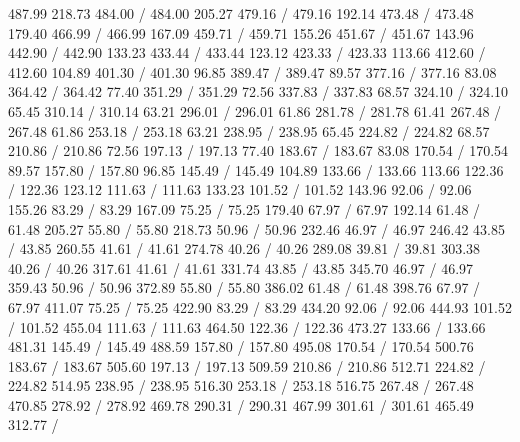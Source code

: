 { 487.99 218.73 484.00 /
 484.00 205.27 479.16 /
 479.16 192.14 473.48 /
 473.48 179.40 466.99 /
 466.99 167.09 459.71 /
 459.71 155.26 451.67 /
 451.67 143.96 442.90 /
 442.90 133.23 433.44 /
 433.44 123.12 423.33 /
 423.33 113.66 412.60 /
 412.60 104.89 401.30 /
 401.30 96.85 389.47 /
 389.47 89.57 377.16 /
 377.16 83.08 364.42 /
 364.42 77.40 351.29 /
 351.29 72.56 337.83 /
 337.83 68.57 324.10 /
 324.10 65.45 310.14 /
 310.14 63.21 296.01 /
 296.01 61.86 281.78 /
 281.78 61.41 267.48 /
 267.48 61.86 253.18 /
 253.18 63.21 238.95 /
 238.95 65.45 224.82 /
 224.82 68.57 210.86 /
 210.86 72.56 197.13 /
 197.13 77.40 183.67 /
 183.67 83.08 170.54 /
 170.54 89.57 157.80 /
 157.80 96.85 145.49 /
 145.49 104.89 133.66 /
 133.66 113.66 122.36 /
 122.36 123.12 111.63 /
 111.63 133.23 101.52 /
 101.52 143.96 92.06 /
 92.06 155.26 83.29 /
 83.29 167.09 75.25 /
 75.25 179.40 67.97 /
 67.97 192.14 61.48 /
 61.48 205.27 55.80 /
 55.80 218.73 50.96 /
 50.96 232.46 46.97 /
 46.97 246.42 43.85 /
 43.85 260.55 41.61 /
 41.61 274.78 40.26 /
 40.26 289.08 39.81 /
 39.81 303.38 40.26 /
 40.26 317.61 41.61 /
 41.61 331.74 43.85 /
 43.85 345.70 46.97 /
 46.97 359.43 50.96 /
 50.96 372.89 55.80 /
 55.80 386.02 61.48 /
 61.48 398.76 67.97 /
 67.97 411.07 75.25 /
 75.25 422.90 83.29 /
 83.29 434.20 92.06 /
 92.06 444.93 101.52 /
 101.52 455.04 111.63 /
 111.63 464.50 122.36 /
 122.36 473.27 133.66 /
 133.66 481.31 145.49 /
 145.49 488.59 157.80 /
 157.80 495.08 170.54 /
 170.54 500.76 183.67 /
 183.67 505.60 197.13 /
 197.13 509.59 210.86 /
 210.86 512.71 224.82 /
 224.82 514.95 238.95 /
 238.95 516.30 253.18 /
 253.18 516.75 267.48 /
\setsolid
{} 267.48 470.85 278.92 /
 278.92 469.78 290.31 /
 290.31 467.99 301.61 /
 301.61 465.49 312.77 /
}
